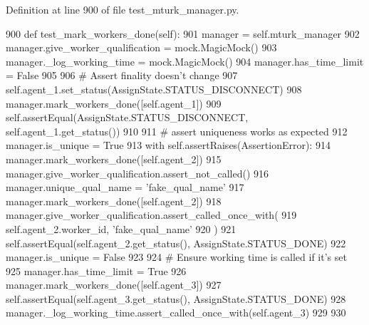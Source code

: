 Definition at line 900 of file test\+\_\+mturk\+\_\+manager.\+py.


\begin{DoxyCode}
900     \textcolor{keyword}{def }test\_mark\_workers\_done(self):
901         manager = self.mturk\_manager
902         manager.give\_worker\_qualification = mock.MagicMock()
903         manager.\_log\_working\_time = mock.MagicMock()
904         manager.has\_time\_limit = \textcolor{keyword}{False}
905 
906         \textcolor{comment}{# Assert finality doesn't change}
907         self.agent\_1.set\_status(AssignState.STATUS\_DISCONNECT)
908         manager.mark\_workers\_done([self.agent\_1])
909         self.assertEqual(AssignState.STATUS\_DISCONNECT, self.agent\_1.get\_status())
910 
911         \textcolor{comment}{# assert uniqueness works as expected}
912         manager.is\_unique = \textcolor{keyword}{True}
913         with self.assertRaises(AssertionError):
914             manager.mark\_workers\_done([self.agent\_2])
915         manager.give\_worker\_qualification.assert\_not\_called()
916         manager.unique\_qual\_name = \textcolor{stringliteral}{'fake\_qual\_name'}
917         manager.mark\_workers\_done([self.agent\_2])
918         manager.give\_worker\_qualification.assert\_called\_once\_with(
919             self.agent\_2.worker\_id, \textcolor{stringliteral}{'fake\_qual\_name'}
920         )
921         self.assertEqual(self.agent\_2.get\_status(), AssignState.STATUS\_DONE)
922         manager.is\_unique = \textcolor{keyword}{False}
923 
924         \textcolor{comment}{# Ensure working time is called if it's set}
925         manager.has\_time\_limit = \textcolor{keyword}{True}
926         manager.mark\_workers\_done([self.agent\_3])
927         self.assertEqual(self.agent\_3.get\_status(), AssignState.STATUS\_DONE)
928         manager.\_log\_working\_time.assert\_called\_once\_with(self.agent\_3)
929 
930 
\end{DoxyCode}
\mbox{\label{classparlai_1_1mturk_1_1core_1_1test_1_1test__mturk__manager_1_1TestMTurkManagerUnitFunctions_a178934378f2db3695c5999caccabd675}} 
